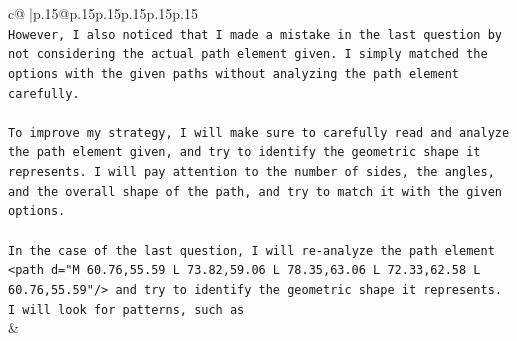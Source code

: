 \documentclass{article}
\begin{document}
{\begin{supertabular}{c@{$\;$}|p{.15\linewidth}@{}p{.15\linewidth}p{.15\linewidth}p{.15\linewidth}p{.15\linewidth}p{.15\linewidth}}
{{{\\ 
\texttt{However, I also noticed that I made a mistake in the last question by not considering the actual path element given. I simply matched the options with the given paths without analyzing the path element carefully. } \\
\\ 
\texttt{To improve my strategy, I will make sure to carefully read and analyze the path element given, and try to identify the geometric shape it represents. I will pay attention to the number of sides, the angles, and the overall shape of the path, and try to match it with the given options.} \\
\\ 
\texttt{In the case of the last question, I will re{-}analyze the path element <path d="M 60.76,55.59 L 73.82,59.06 L 78.35,63.06 L 72.33,62.58 L 60.76,55.59"/> and try to identify the geometric shape it represents. I will look for patterns, such as} \\
            }
        }
    }
    & \\ \\

\end{supertabular}
}
\end{document}
